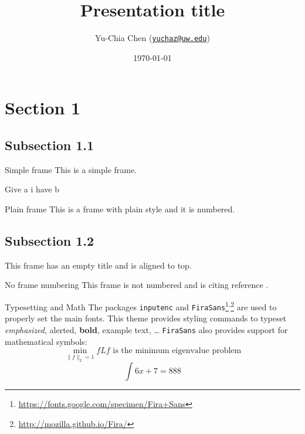 \documentclass[aspectratio=169]{beamer}
\title{Presentation title}
\subtitle{}
\author{Yu-Chia Chen (\texttt{\href{mailto:yuchaz@uw.edu}{yuchaz@uw.edu}})}
\institute{Department of Electrical \& Computer Engineering \\ University of Washington}
\date{\today}
\begin{document}
    \begin{frame}
        \maketitle
    \end{frame}
    
    \section{Section 1}
    \subsection{Subsection 1.1}
    \begin{frame}{Simple frame}
        This is a simple frame.
        \begin{theorem}[Test]
        	Give a i have b
        \end{theorem}
    \end{frame}

    \begin{frame}[plain]{Plain frame}
        This is a frame with plain style and it is numbered.
    \end{frame}
    
    \subsection{Subsection 1.2}
    \begin{frame}[t]
        This frame has an empty title and is aligned to top.
    \end{frame}
    
    \begin{frame}[noframenumbering]{No frame numbering}
        This frame is not numbered and is citing reference \cite{knuth74}.
    \end{frame}
    
    \begin{frame}{Typesetting and Math}
        The packages \texttt{inputenc} and \texttt{FiraSans}\footnote{\url{https://fonts.google.com/specimen/Fira+Sans}}\textsuperscript{,}\footnote{\url{http://mozilla.github.io/Fira/}} are used to properly set the main fonts.
        \vfill
        This theme provides styling commands to typeset \emph{emphasized}, \alert{alerted}, \textbf{bold}, \textcolor{example}{example text}, \dots
        \vfill
        \texttt{FiraSans} also provides support for mathematical symbols:
        \begin{equation*}
            \min_{\|f\|_2 = 1} fLf \text{ is the minimum eigenvalue problem} 
        \end{equation*}
        \begin{equation}
        	\int 6x+7 = 888
        \end{equation}
        
    \end{frame}
\end{document}
